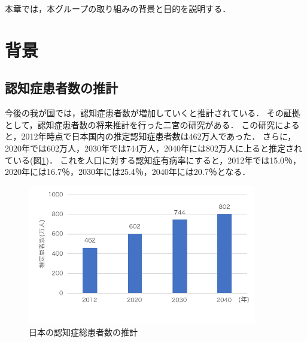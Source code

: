 \documentclass[../report]{subfiles}
\begin{document}
本章では，本グループの取り組みの背景と目的を説明する．

\section{背景}
\subsection{認知症患者数の推計}
今後の我が国では，認知症患者数が増加していくと推計されている．
その証拠として，認知症患者数の将来推計を行った二宮の研究\cite{syourai}がある．
この研究によると，2012年時点で日本国内の推定認知症患者数は462万人であった．
さらに，2020年では602万人，2030年では744万人，2040年には802万人に上ると推定されている(図\ref{fig:dementia-paitents-trasition})．
これを人口に対する認知症有病率にすると，2012年では15.0％，2020年には16.7％，2030年には25.4％，2040年には20.7％となる．
\begin{figure}[htbp]
    \begin{center}
        \includegraphics[width=10cm]{imgs/1_dementia-paitents-trasition.pdf}
        \caption{日本の認知症総患者数の推計}
        \label{fig:dementia-paitents-trasition}
    \end{center}
\end{figure}
\end{document}

